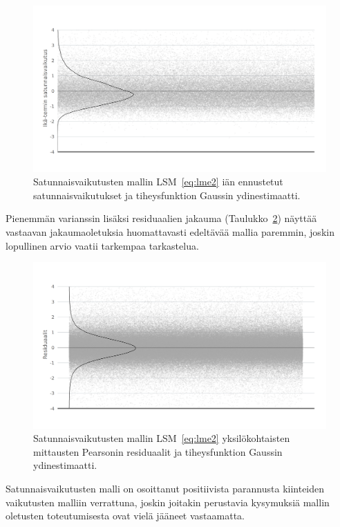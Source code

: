 \documentclass[finnish]{docopts}
\begin{document}
\begin{figure}[H]
\centering
  \includegraphics[scale=0.8]{kuvaajat/lme2_ika_satunnaisvaikutukset.png}
  \caption{Satunnaisvaikutusten mallin LSM~\ref{eq:lme2} iän ennustetut satunnaisvaikutukset ja tiheysfunktion Gaussin ydinestimaatti.}
  \label{fig:lme2_ika_ranef}
\end{figure}

Pienemmän varianssin lisäksi residuaalien jakauma (Taulukko~\ref{fig:lme2_resid}) näyttää vastaavan jakaumaoletuksia huomattavasti edeltävää mallia paremmin, joskin lopullinen arvio vaatii tarkempaa tarkastelua.\\

\begin{figure}[H]
\centering
  \includegraphics[scale=0.8]{kuvaajat/lme2_residuaalit.png}
  \caption{Satunnaisvaikutusten mallin LSM~\ref{eq:lme2} yksilökohtaisten mittausten Pearsonin residuaalit ja tiheysfunktion Gaussin ydinestimaatti.}
  \label{fig:lme2_resid}
\end{figure}

Satunnaisvaikutusten malli on osoittanut positiivista parannusta kiinteiden vaikutusten malliin verrattuna, joskin joitakin perustavia kysymuksiä mallin oletusten toteutumisesta ovat vielä jääneet vastaamatta.\\
\end{document}
